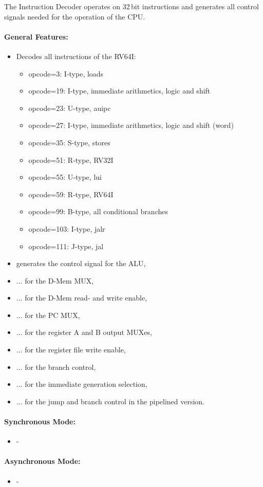 The Instruction Decoder operates on 32\,bit instructions and generates all control signals needed for the operation of the CPU.

\paragraph{General Features: }
\begin{itemize}
  \item Decodes all instructions of the RV64I:
  \begin{itemize}
    \item opcode=3: I-type, loads
    \item opcode=19: I-type, immediate arithmetics, logic and shift
    \item opcode=23: U-type, auipc
    \item opcode=27: I-type, immediate arithmetics, logic and shift (word)
    \item opcode=35: S-type, stores
    \item opcode=51: R-type, RV32I
    \item opcode=55: U-type, lui
    \item opcode=59: R-type, RV64I
    \item opcode=99: B-type, all conditional branches
    \item opcode=103: I-type, jalr
    \item opcode=111: J-type, jal
  \end{itemize}
  \item generates the control signal for the ALU,
  \item ... for the D-Mem MUX,
  \item ... for the D-Mem read- and write enable,
  \item ... for the PC MUX,
  \item ... for the register A and B output MUXes,
  \item ... for the register file write enable,
  \item ... for the branch control,
  \item ... for the immediate generation selection,
  \item ... for the jump and branch control in the pipelined version. 
\end{itemize}

\paragraph{Synchronous Mode: }
\begin{itemize}
  \item -
\end{itemize}

\paragraph{Asynchronous Mode: }
\begin{itemize}
  \item -
\end{itemize}
